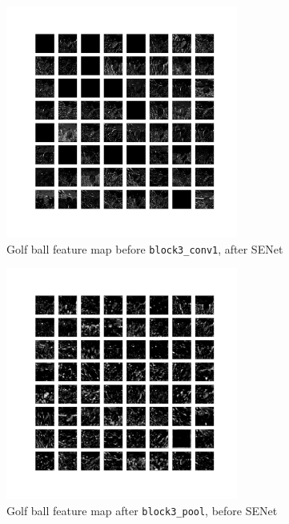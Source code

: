 \documentclass{article}
\begin{document}
\begin{appendices}
\begin{figure}[H]
    \centering
    \includegraphics[width=3in]{csci-8110/hw-3/images/golf-post-SENet-block2_pool-2020-11-05 18_25_10.151699_output.png}
    \caption{Golf ball feature map before \lstinline{block3_conv1}, after SENet}
    \label{fig:golf_2_post}
\end{figure}
\begin{figure}[H]
    \centering
    \includegraphics[width=3in]{csci-8110/hw-3/images/golf-pre-SENet-block3_pool-2020-11-05 18_29_43.542902_output.png}
    \caption{Golf ball feature map after \lstinline{block3_pool}, before SENet}
    \label{fig:golf_3_pre}
\end{figure}


\end{appendices}
\end{document}
